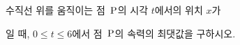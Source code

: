 수직선 위를 움직이는 점~$\mathrm{P}$의 시각 $t$에서의 위치 $x$가 \par\smallskip{}\par\smallskip\noindent 일 때, $0\le t\le 6$에서 점~$\mathrm{P}$의 속력의 최댓값을 구하시오.
